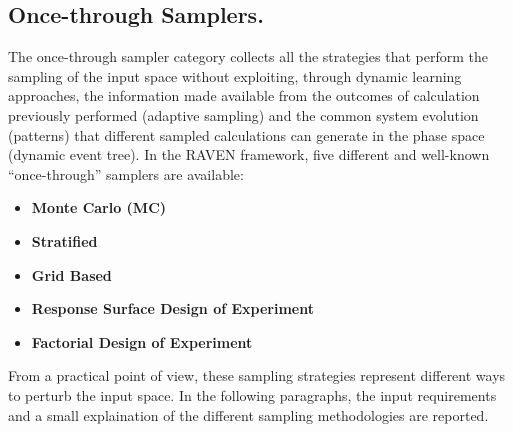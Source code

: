 \subsection{Once-through Samplers.}
\label{subsec:onceThroughSamplers}
The once-through sampler category collects all the strategies that perform the sampling of the input space without exploiting, through dynamic learning approaches, the information made available from the outcomes of calculation previously performed (adaptive sampling) and the common system evolution (patterns) that different sampled calculations can generate in the phase space (dynamic event tree). 
In the RAVEN framework, five different and well-known “once-through” samplers are available: 
\begin{itemize}
\item \textbf{Monte Carlo (MC)}
\item \textbf{Stratified}
\item \textbf{Grid Based}
\item \textbf{Response Surface Design of Experiment}
\item \textbf{Factorial Design of Experiment}
\end{itemize}
From a practical point of view, these sampling strategies represent different ways to perturb the input space. In the following paragraphs, the input requirements and a small explaination of the different sampling methodologies are reported.

